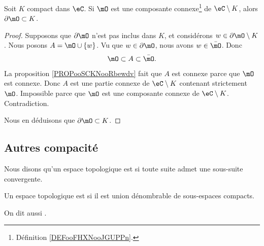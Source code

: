 \begin{proposition}       \label{PROPooOXKSooEDzCRZ}
	Soit \( K\) compact dans \( \eC\). Si \( \mO\) est une composante connexe\footnote{Définition \ref{DEFooFHXNooJGUPPn}.} de \( \eC\setminus K\), alors \( \partial \mO\subset K\).
\end{proposition}

\begin{proof}
	Supposons que \( \partial\mO\) n'est pas inclus dans \( K\), et considérons \( w\in\partial\mO\setminus K\). Nous posons \( A=\mO\cup\{ w \}\). Vu que \( w\in\partial\mO\), nous avons \( w\in\bar\mO\). Donc
	\begin{equation}
		\mO\subset A\subset\bar\mO.
	\end{equation}
	La proposition \ref{PROPooSCKNooRbewdv} fait que \( A\) est connexe parce que \( \mO\) est connexe. Donc \( A\) est une partie connexe de \( \eC\setminus K\) contenant strictement \( \mO\). Impossible parce que \( \mO\) est une composante connexe de \( \eC\setminus K\). Contradiction.

	Nous en déduisons que \( \partial\mO\subset K\).
\end{proof}



\subsection{Autres compacité}

\begin{definition}        \label{DEFooTVDOooZbwOFK}
	Nous disons qu'un espace topologique est  si toute suite admet une sous-suite convergente.
\end{definition}

\begin{definition}	\label{DEFooSOLWooWlSiUn}
	Un espace topologique est  si il est union dénombrable de sous-espaces compacts.

	On dit aussi .
\end{definition}


